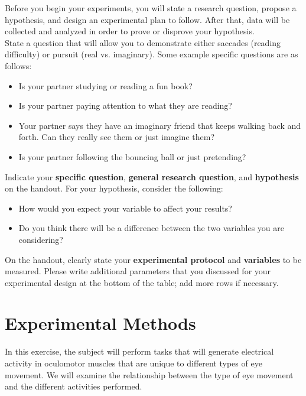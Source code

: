 \documentclass{article}
\begin{document}
Before you begin your experiments, you will state a research question, propose a hypothesis, and design an experimental plan to follow. After that, data will be collected and analyzed in order to prove or disprove your hypothesis.\\

State a question that will allow you to demonstrate either saccades (reading difficulty) or pursuit (real vs. imaginary). Some example specific questions are as follows:\begin{itemize}
	\item Is your partner studying or reading a fun book?
	\item Is your partner paying attention to what they are reading?
	\item Your partner says they have an imaginary friend that keeps walking back and forth. Can they really see them or just imagine them?
	\item Is your partner following the bouncing ball or just pretending?
\end{itemize}

Indicate your \textbf{specific question}, \textbf{general research question}, and \textbf{hypothesis} on the handout. For your hypothesis, consider the following:\begin{itemize}
	\item How would you expect your variable to affect your results?
	\item Do you think there will be a difference between the two variables you are considering?
\end{itemize}

On the handout, clearly state your \textbf{experimental protocol} and \textbf{variables} to be measured. Please write additional parameters that you discussed for your experimental design at the bottom of the table; add more rows if necessary.

\section*{Experimental Methods}
In this exercise, the subject will perform tasks that will generate electrical activity in oculomotor muscles that are unique to different types of eye movement. We will examine the relationship between the type of eye movement and the different activities performed.\\
\end{document}
